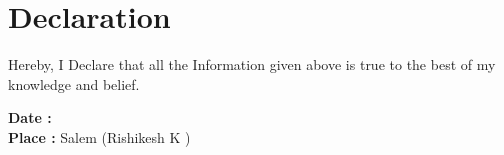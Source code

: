 \documentclass[a4paper,12pt]{article}
\begin{document}
\item[   ]
\item[   ]
\item[   ]
\item[   ]
\item[   ]
\item[   ]
\item[   ]
\item[   ]



\section{Declaration}
Hereby, I Declare that all the Information given above is true to the best of my knowledge and belief.
\\
\item[  ]
\item[  ]
{\textbf{Date   :}}  \hfill  \\

{\textbf{Place :}    Salem}  \hfill (Rishikesh K )\\
\vfill
\end{document}
